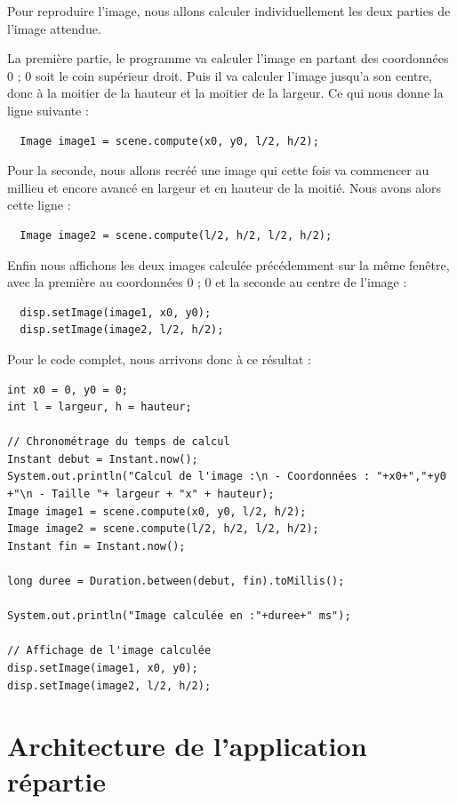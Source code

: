 \documentclass[a4paper,11pt]{article}
\begin{document}
Pour reproduire l'image, nous allons calculer individuellement les deux parties de l'image attendue.

La première partie, le programme va calculer l'image en partant des coordonnées 0 ; 0 soit le coin supérieur droit. Puis il va calculer l'image jusqu'a son centre, donc à la moitier de la hauteur et la moitier de la largeur. Ce qui nous donne la ligne suivante :

\begin{lstlisting}
  Image image1 = scene.compute(x0, y0, l/2, h/2);
\end{lstlisting}

Pour la seconde, nous allons recréé une image qui cette fois va commencer au millieu et encore avancé en largeur et en hauteur de la moitié. Nous avons alors cette ligne :

\begin{lstlisting}
  Image image2 = scene.compute(l/2, h/2, l/2, h/2);
\end{lstlisting}

Enfin nous affichons les deux images calculée précédemment sur la même fenêtre, avec la première au coordonnées 0 ; 0 et la seconde au centre de l'image :

\begin{lstlisting}
  disp.setImage(image1, x0, y0);
  disp.setImage(image2, l/2, h/2);
\end{lstlisting}

Pour le code complet, nous arrivons donc à ce résultat :

\begin{lstlisting}
int x0 = 0, y0 = 0;
int l = largeur, h = hauteur;

// Chronométrage du temps de calcul
Instant debut = Instant.now();
System.out.println("Calcul de l'image :\n - Coordonnées : "+x0+","+y0
+"\n - Taille "+ largeur + "x" + hauteur);
Image image1 = scene.compute(x0, y0, l/2, h/2);
Image image2 = scene.compute(l/2, h/2, l/2, h/2);
Instant fin = Instant.now();

long duree = Duration.between(debut, fin).toMillis();

System.out.println("Image calculée en :"+duree+" ms");

// Affichage de l'image calculée
disp.setImage(image1, x0, y0);
disp.setImage(image2, l/2, h/2);
\end{lstlisting}

\newpage

\section{Architecture de l'application répartie}
\end{document}
